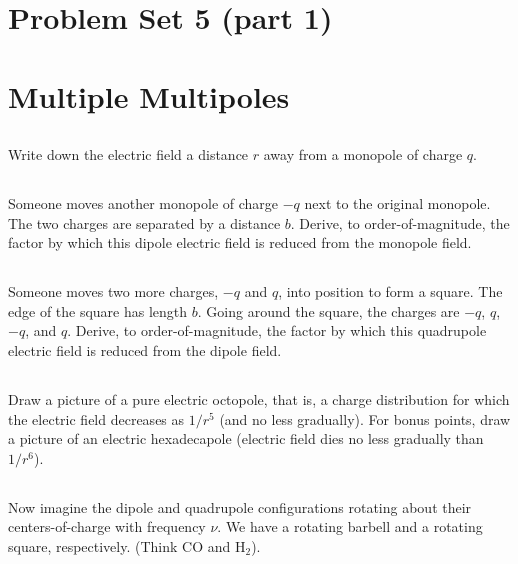 \documentclass[11pt]{article}
\begin{document}
\pagestyle{empty}
\parindent=0pt

\section*{\centering Problem Set 5 (part 1)}

\section{Multiple Multipoles}

\subsection{}
Write down the electric field a distance $r$ away from a monopole of charge $q$.


\subsection{}
Someone moves another monopole of charge $−q$ next to the original monopole.
The two charges are separated by a distance $b$. Derive, to order-of-magnitude,
the factor by which this dipole electric field is reduced from the monopole
field.

\subsection{}
Someone moves two more charges, $-q$ and $q$, into position to
form a square.  The edge of the square has length $b$. Going around the square,
the charges are $-q$, $q$, $-q$, and $q$. Derive, to order-of-magnitude, the
factor by which this quadrupole electric field is reduced from the dipole
field.

\subsection{}
Draw a picture of a pure electric octopole, that is, a charge distribution
for which the electric field decreases as $1/r^5$ (and no less gradually). For
bonus points, draw a picture of an electric hexadecapole (electric field dies
no less gradually than $1/r^6$).

\subsection{}
Now imagine the dipole and quadrupole configurations 
rotating about their centers-of-charge with frequency $\nu$. We have a rotating
barbell and a rotating square, respectively. (Think CO and H$_2$).
\end{document}
